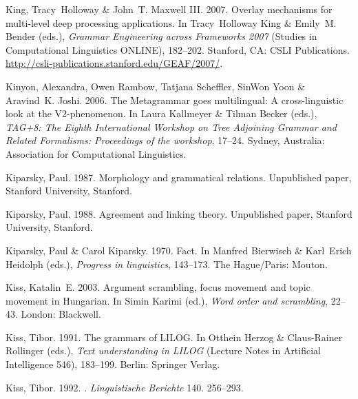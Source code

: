 \begin{thebibliography}{1420}
King, Tracy~Holloway \& John~T. {Maxwell III}. 2007.
\newblock Overlay mechanisms for multi-level deep processing applications.
\newblock In Tracy~Holloway King \& Emily~M. Bender (eds.), \emph{{Grammar
  Engineering across Frameworks 2007}}  (Studies in Computational Linguistics
  ONLINE), 182--202. Stanford, CA: CSLI Publications.
\newblock \urlprefix\url{http://csli-publications.stanford.edu/GEAF/2007/}.

Kinyon, Alexandra, Owen Rambow, Tatjana Scheffler, SinWon Yoon \& Aravind~K.
  Joshi. 2006.
\newblock The {Metagrammar} goes multilingual: {A} cross-linguistic look at the
  {V2}-phenomenon.
\newblock In Laura Kallmeyer \& Tilman Becker (eds.), \emph{{TAG+8: {The}
  Eighth International Workshop on Tree Adjoining Grammar and Related
  Formalisms}: {Proceedings} of the workshop}, 17--24. Sydney, Australia:
  Association for Computational Linguistics.

Kiparsky, Paul. 1987.
\newblock Morphology and grammatical relations.
\newblock Unpublished paper, Stanford University, Stanford.

Kiparsky, Paul. 1988.
\newblock Agreement and linking theory.
\newblock Unpublished paper, Stanford University, Stanford.

Kiparsky, Paul \& Carol Kiparsky. 1970.
\newblock Fact.
\newblock In Manfred Bierwisch \& Karl~Erich Heidolph (eds.), \emph{Progress in
  linguistics}, 143--173. The Hague/Paris: Mouton.

Kiss, Katalin~E. 2003.
\newblock Argument scrambling, focus movement and topic movement in
  {Hungarian}.
\newblock In Simin Karimi (ed.), \emph{Word order and scrambling}, 22--43.
  London: Blackwell.

Kiss, Tibor. 1991.
\newblock The grammars of {LILOG}.
\newblock In Otthein Herzog \& Claus-Rainer Rollinger (eds.), \emph{Text
  understanding in {LILOG}} (Lecture Notes in Artificial Intelligence 546),
  183--199. Berlin: Springer Verlag.

Kiss, Tibor. 1992.
.
\newblock \emph{Linguistische Berichte} 140. 256--293.


\end{thebibliography}
